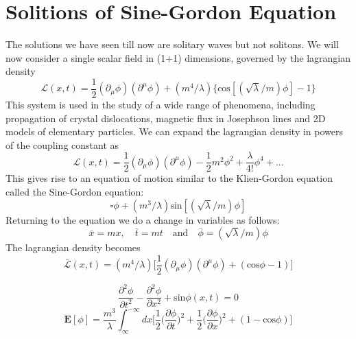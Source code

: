 \documentclass[a4paper, 12pt]{article}
\begin{document}
 \section {Solitions of Sine-Gordon Equation}
 The solutions we have seen till now are solitary waves but not solitons. We will now consider a single scalar field in (1+1) dimensions, governed by the lagrangian density
 \begin{equation}%
\mathcal{L}(x,t) = \frac{1}{2}(\partial_{\mu}\phi)(\partial^{\mu}\phi) +(m^4/\lambda) \{\textrm{cos}[(\sqrt{\lambda}/m)\phi]-1\}
\end{equation}
 This system is used in the study of a wide range of  phenomena, including propagation of crystal dislocations, magnetic flux in Josephson lines and 2D models of elementary particles. We can expand the lagrangian density in powers of the coupling constant as
  \begin{equation}%
\mathcal{L}(x,t) = \frac{1}{2}(\partial_{\mu}\phi)(\partial^{\mu}\phi) -\frac{1}{2}m^2 \phi^2 + \frac{\lambda}{4!}\phi^4 + ...
\end{equation}
 This gives rise to an equation of motion similar to the Klien-Gordon equation called the Sine-Gordon equation:
   \begin{equation}%
\square \phi + (m^3/\lambda)\textrm{sin}[(\sqrt{\lambda}/m)\phi]
\end{equation}
 Returning to the equation we do a change in variables as follows:
    \begin{equation}%
\bar{x}=mx, \quad \bar{t}= mt \quad\textrm{and} \quad\bar{\phi}=(\sqrt{\lambda}/m)\phi
\end{equation}
The lagrangian density becomes
  \begin{equation}%
\mathcal{\bar{L}}(x,t) = (m^4/\lambda)\bigg[\frac{1}{2}(\partial_{\mu}\phi)(\partial^{\mu}\phi) +(\textrm{cos}\phi -1
)\bigg]
\end{equation}

 \begin{equation}%
\frac{\partial^2\phi}{\partial t^2} - \frac{\partial^2\phi}{\partial x^2} +\textrm{sin}\phi(x,t)=0
\end{equation}
 \begin{equation}%
\bm  E[\phi] =\frac{m^3}{\lambda} \int_{\infty}^{-\infty} dx \bigg[ \frac{1}{2}\bigg(\frac{\partial\phi}{\partial t}\bigg)^2 +\frac{1}{2}\bigg(\frac{\partial\phi}{\partial x}\bigg)^2 +(1 -\textrm{cos}\phi
) \bigg]
 \end{equation}
\end{document}
